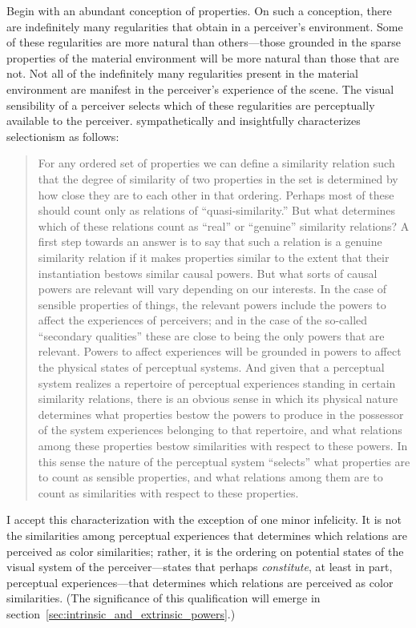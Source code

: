\documentclass[12pt]{article}
\begin{document}
Begin with an abundant conception of properties. On such a conception, there are indefinitely many regularities that obtain in a perceiver's environment. Some of these regularities are more natural than others---those grounded in the sparse properties of the material environment will be more natural than those that are not. Not all of the indefinitely many regularities present in the material environment are manifest in the perceiver's experience of the scene. The visual sensibility of a perceiver selects which of these regularities are perceptually available to the perceiver. \citet{Shoemaker:wk} sympathetically and insightfully characterizes selectionism as follows: 
\begin{quote}
	For any ordered set of properties we can define a similarity relation such that the degree of similarity of two properties in the set is determined by how close they are to each other in that ordering. Perhaps most of these should count only as relations of ``quasi-similarity.'' But what determines which of these relations count as ``real'' or ``genuine'' similarity relations? A first step towards an answer is to say that such a relation is a genuine similarity relation if it makes properties similar to the extent that their instantiation bestows similar causal powers. But what sorts of causal powers are relevant will vary depending on our interests. In the case of sensible properties of things, the relevant powers include the powers to affect the experiences of perceivers; and in the case of the so-called ``secondary qualities'' these are close to being the only powers that are relevant. Powers to affect experiences will be grounded in powers to affect the physical states of perceptual systems. And given that a perceptual system realizes a repertoire of perceptual experiences standing in certain similarity relations, there is an obvious sense in which its physical nature determines what properties bestow the powers to produce in the possessor of the system experiences belonging to that repertoire, and what relations among these properties bestow similarities with respect to these powers. In this sense the nature of the perceptual system ``selects'' what properties are to count as sensible properties, and what relations among them are to count as similarities with respect to these properties. 
\end{quote}
I accept this characterization with the exception of one minor infelicity. It is not the similarities among perceptual experiences that determines which relations are perceived as color similarities; rather, it is the ordering on potential states of the visual system of the perceiver---states that perhaps \emph{constitute}, at least in part, perceptual experiences---that determines which relations are perceived as color similarities. (The significance of this qualification will emerge in section~\ref{sec:intrinsic_and_extrinsic_powers}.)
\end{document}
